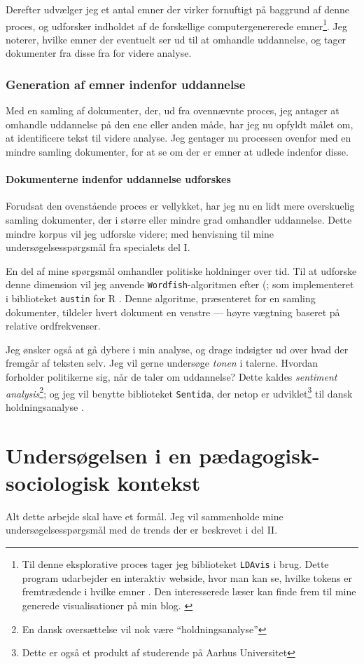 Derefter udvælger jeg et antal emner der virker fornuftigt på baggrund af denne proces,
og udforsker indholdet af de forskellige computergenererede emner\footnote{
Til denne eksplorative proces tager jeg biblioteket \texttt{LDAvis} i brug.
Dette program udarbejder en interaktiv webside, hvor man kan se,
hvilke tokens er fremtrædende i hvilke emner \autocite{sievertCpsievertLDAvis2020}.
Den interesserede læser kan finde frem til mine generede visualisationer på min blog. \autocite{andersenSelectedAssignmentsAarhus}}.
Jeg noterer, hvilke emner der eventuelt ser ud til at omhandle uddannelse, og tager dokumenter fra disse fra for videre analyse.

\subsection{Generation af emner indenfor uddannelse}
Med en samling af dokumenter, der, ud fra ovennævnte proces, jeg antager at omhandle uddannelse på den ene eller anden måde, har jeg nu opfyldt målet om, at identificere tekst til videre analyse.
Jeg gentager nu processen ovenfor med en mindre samling dokumenter, for at se om der er emner at udlede indenfor disse.

\subsubsection{Dokumenterne indenfor uddannelse udforskes}
Forudsat den ovenstående proces er vellykket, har jeg nu en lidt mere overskuelig samling dokumenter, der i større eller mindre grad omhandler uddannelse.
Dette mindre korpus vil jeg udforske videre; med henvisning til mine undersøgelsesspørgsmål fra specialets del I.

En del af mine spørgsmål omhandler politiske holdninger over tid. Til at udforske denne dimension vil jeg anvende \texttt{Wordfish}-algoritmen efter \citeauthor{slapinScalingModelEstimating2008} (\citeyear{slapinScalingModelEstimating2008}; som implementeret i biblioteket \texttt{austin} for R \autocite{loweAustinPackageDoing2019}.
Denne algoritme, præsenteret for en samling dokumenter, tildeler hvert dokument en venstre — høyre vægtning baseret på relative ordfrekvenser.

Jeg ønsker også at gå dybere i min analyse, og drage indsigter ud over hvad der fremgår af teksten selv.
Jeg vil gerne undersøge \textit{tonen} i talerne.
Hvordan forholder politikerne sig, når de taler om uddannelse?
Dette kaldes \textit{sentiment analysis}\footnote{En dansk oversættelse vil nok være “holdningsanalyse”}; og jeg vil benytte biblioteket \texttt{Sentida}, der netop er udviklet\footnote{Dette er også et produkt af studerende på Aarhus Universitet} til dansk holdningsanalyse \autocite{lauridsenSentida2020}.

\chapter{Undersøgelsen i en pædagogisk-sociologisk kontekst}\label{chap:edusoc}

Alt dette arbejde skal have et formål.
Jeg vil sammenholde mine undersøgelsesspørgsmål med de trends der er beskrevet i del II.

